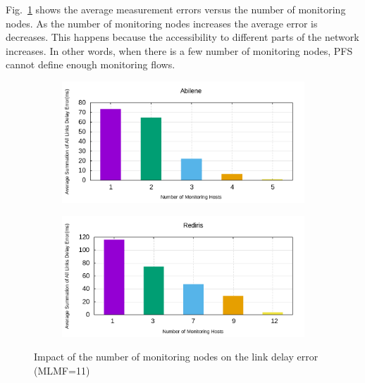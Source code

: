 \documentclass[10pt, journal, letterpaper]{IEEEtran}
\begin{document}
Fig.~\ref{fig:eval_Abilene_summation_of_all_links_delay_error_ms_bar_chart} shows the average measurement errors versus the number of monitoring nodes. As the number of monitoring nodes increases the average error is decreases. This happens because the accessibility to different parts of the network increases. In other words, when there is a few number of monitoring nodes, PFS cannot define enough monitoring flows. 
\begin{figure}
    \begin{subfigure}{0.48\columnwidth}
      \centering
      \includegraphics[width=\columnwidth]{img/eval_Abilene_summation_of_all_links_delay_error_ms_bar_chart.png}
    \end{subfigure}
    \begin{subfigure}{0.49\columnwidth}
      \centering
      \includegraphics[width=\columnwidth]{img/eval_RedIRIS_summation_of_all_links_delay_error_ms_bar_chart.png}
    \end{subfigure}
    \caption{Impact of the number of monitoring nodes on the link delay error (MLMF=11)}
    \label{fig:eval_Abilene_summation_of_all_links_delay_error_ms_bar_chart}
\end{figure}
\end{document}
